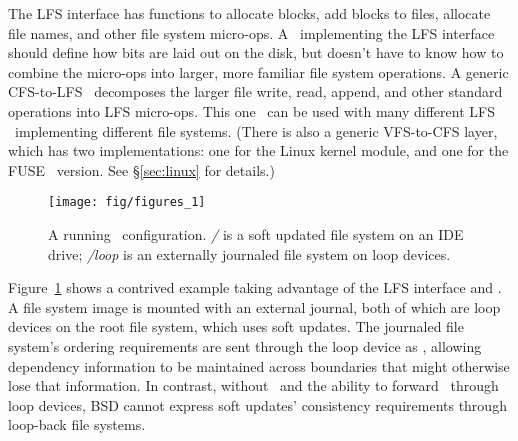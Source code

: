 The LFS interface has functions to allocate blocks, add blocks to files,
allocate file names, and other file system micro-ops. A \module\ implementing
the LFS interface should define how bits are laid out on the disk, but doesn't
have to know how to combine the micro-ops into larger, more familiar file system
operations. A generic CFS-to-LFS \module\ decomposes the larger file write,
read, append, and other standard operations into LFS micro-ops. This one
\module\ can be used with many different LFS \modules\ implementing different
file systems. (There is also a generic VFS-to-CFS layer, which has two
implementations: one for the Linux kernel module, and one for the
FUSE~\cite{fuse} version. See \S\ref{sec:linux} for details.)

\begin{figure}[tb]
  \centering
  \texttt{[image: fig/figures\_1]}
  \caption{A running \Kudos\ configuration. {\it/} is a soft updated
    file system on an IDE drive; {\it/loop} is an externally journaled
    file system on loop devices.}
  \label{fig:kfs-graph}
\end{figure}

Figure~\ref{fig:kfs-graph} shows a contrived example taking advantage of the LFS
interface and \chdescs. A file system image is mounted with an external journal,
both of which are loop devices on the root file system, which uses soft updates.
The journaled file system's ordering requirements are sent through the loop
device as \chdescs, allowing dependency information to be maintained across
boundaries that might otherwise lose that information. In contrast, without
\chdescs\ and the ability to forward \chdescs\ through loop devices, BSD cannot
express soft updates' consistency requirements through loop-back file systems.
